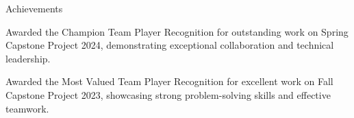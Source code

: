 \documentclass{resume} %
\begin{document}
    \begin{rSection}{Achievements}
        \begin{rSubsection}{}{}{}
                            \item Awarded the Champion Team Player Recognition for outstanding work on Spring Capstone Project 2024, demonstrating exceptional collaboration and technical leadership.
                            \item Awarded the Most Valued Team Player Recognition for excellent work on Fall Capstone Project 2023, showcasing strong problem{-}solving skills and effective teamwork.
                    \end{rSubsection}
    \end{rSection}

\newcommand\myfontsize{\fontsize{0.1pt}{0.1pt}\selectfont} \myfontsize \color{white}
\end{document}
